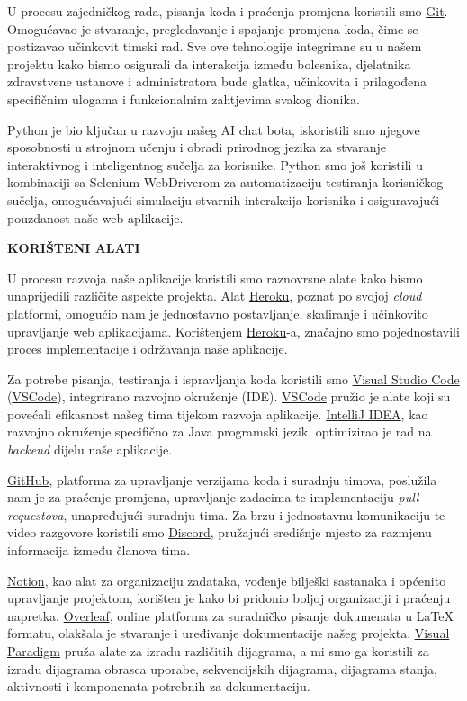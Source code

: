 U procesu zajedničkog rada, pisanja koda i praćenja promjena koristili smo \href{https://git-scm.com/}{Git}. Omogućavao je stvaranje, pregledavanje i spajanje promjena koda, čime se postizavao učinkovit timski rad. Sve ove tehnologije integrirane su u našem projektu kako bismo osigurali da interakcija između bolesnika, djelatnika zdravstvene ustanove i administratora bude glatka, učinkovita i prilagođena specifičnim ulogama i funkcionalnim zahtjevima svakog dionika.

Python je bio ključan u razvoju našeg AI chat bota, iskoristili smo njegove sposobnosti u strojnom učenju i obradi prirodnog jezika za stvaranje interaktivnog i inteligentnog sučelja za korisnike. Python smo još koristili u kombinaciji sa Selenium WebDriverom za automatizaciju testiranja korisničkog sučelja, omogućavajući simulaciju stvarnih interakcija korisnika i osiguravajući pouzdanost naše web aplikacije.

\textbf{KORIŠTENI ALATI
}

U procesu razvoja naše aplikacije koristili smo raznovrsne alate kako bismo unaprijedili različite aspekte projekta. Alat \href{https://www.heroku.com}{Heroku}, poznat po svojoj \textit{cloud} platformi, omogućio nam je jednostavno postavljanje, skaliranje i učinkovito upravljanje web aplikacijama. Korištenjem \href{https://www.heroku.com}{Heroku}-a, značajno smo pojednostavili proces implementacije i održavanja naše aplikacije.

Za potrebe pisanja, testiranja i ispravljanja koda koristili smo \href{https://www.visualstudio.com}{Visual Studio Code} (\href{https://www.visualstudio.com}{VSCode}), integrirano razvojno okruženje (IDE). \href{https://www.visualstudio.com}{VSCode} pružio je alate koji su povećali efikasnost našeg tima tijekom razvoja aplikacije. \href{https://www.jetbrains.com/idea}{IntelliJ IDEA}, kao razvojno okruženje specifično za Java programski jezik, optimizirao je rad na \textit{backend} dijelu naše aplikacije. 

\href{https://github.com}{GitHub}, platforma za upravljanje verzijama koda i suradnju timova, poslužila nam je za praćenje promjena, upravljanje zadacima te implementaciju \textit{pull requestova}, unapređujući suradnju tima. Za brzu i jednostavnu komunikaciju te video razgovore koristili smo \href{https://discord.com}{Discord}, pružajući središnje mjesto za razmjenu informacija između članova tima.


\href{https://www.notion.so}{Notion}, kao alat za organizaciju zadataka, vođenje bilješki sastanaka i općenito upravljanje projektom, korišten je kako bi pridonio boljoj organizaciji i praćenju napretka. \href{https://www.overleaf.com}{Overleaf}, online platforma za suradničko pisanje dokumenata u LaTeX formatu, olakšala je stvaranje i uređivanje dokumentacije našeg projekta.
\href{https://www.visual-paradigm.com}{Visual Paradigm} pruža alate za izradu različitih dijagrama, a mi smo ga koristili za izradu dijagrama obrasca uporabe, sekvencijskih dijagrama, dijagrama stanja, aktivnosti i komponenata potrebnih za dokumentaciju. 

